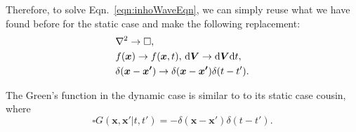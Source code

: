 \documentclass[12pt,english]{article}
\newcommand{\dmr}[1]{\, \mathrm{d}#1} %
\renewcommand{\vec}[1]{\boldsymbol{#1}}
\begin{document}
Therefore, to solve Eqn.~\ref{eqn:inhoWaveEqn}, we can simply reuse what we have found before for the static case and make the following replacement:
\begin{subequations}
    \begin{align}
         & \laplacian \to \square,                                                      \\
         & f(\vec{x}) \to f(\vec{x}, t),\dmr{\vec{V}} \to \mathrm{d}\vec{V}\mathrm{d}t, \\
         & \delta(\vec{x}-\vec{x'}) \to \delta(\vec{x}-\vec{x'})\delta(t-t').
    \end{align}
\end{subequations}

The Green's function in the dynamic case is similar to to its static case cousin, where
\begin{equation}
    \square G(\vec{x}, \vec{x'} | t, t') = -\delta(\vec{x} - \vec{x'})\delta(t- t').
\end{equation}
\end{document}
